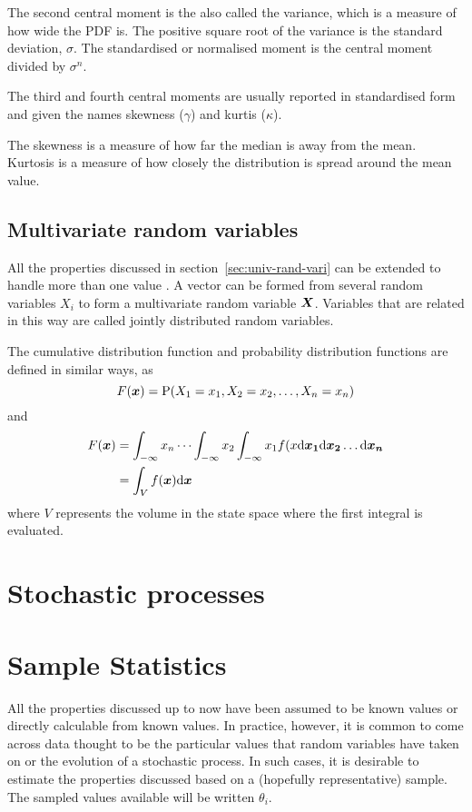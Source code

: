 The second central moment is the also called the variance, which is a measure of how wide the PDF is.
The positive square root of the variance is the standard deviation, $\sigma$.
The standardised or normalised moment is the central moment divided by $\sigma^n$.

The third and fourth central moments are usually reported in standardised form and given the names skewness ($\gamma$) and kurtis ($\kappa$).

The skewness is a measure of how far the median is away from the mean.
Kurtosis is a measure of how closely the distribution is spread around the mean value.

\subsection{Multivariate random variables}
All the properties discussed in section~\ref{sec:univ-rand-vari} can be extended to handle more than one value \cite[65]{kulkarni1999modeling}.
A vector can be formed from several random variables $X_i$ to form a multivariate random variable $\boldsymbol{X}$.
Variables that are related in this way are called jointly distributed random variables.

The cumulative distribution function and probability distribution functions are defined in similar ways, as 
\begin{equation}
  \label{eq:mvcdf}
  F(\boldsymbol{x}) = \mathrm{P}(X_1=x_1, X_2=x_2,\dots, X_n = x_n)
\end{equation}
and
\begin{align}
  \label{eq:mvpdf}
  F(\boldsymbol{x}) &= \int_{-\infty}{x_n}\cdots\int_{-\infty}{x_2}\int_{-\infty}{x_1} f(x \mathrm{d} \boldsymbol{x_1} \mathrm{d} \boldsymbol{x_2} \dots \mathrm{d} \boldsymbol{x_n} \\
              &= \int_V f(\boldsymbol{x}) \mathrm{d} \boldsymbol{x}
\end{align}
where $V$ represents the volume in the state space where the first integral is evaluated.

\section{Stochastic processes}
\label{sec:stochastic-processes}

\section{Sample Statistics}
All the properties discussed up to now have been assumed to be known values or directly calculable from known values.
In practice, however, it is common to come across data thought to be the particular values that random variables have taken on or the evolution of a stochastic process.
In such cases, it is desirable to estimate the properties discussed based on a (hopefully representative) sample.
The sampled values available will be written $\theta_i$.

